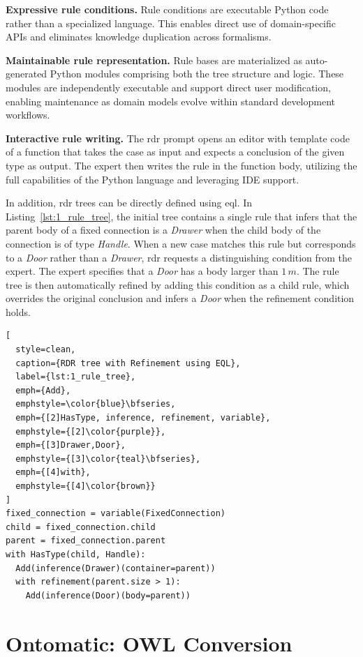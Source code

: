 \documentclass[a4paper,fleqn]{cas-sc}
\begin{document}
\textbf{Expressive rule conditions.} Rule conditions are executable Python code rather than a specialized language. This enables direct use of domain-specific APIs and eliminates knowledge duplication across formalisms.

\textbf{Maintainable rule representation.} Rule bases are materialized as auto-generated Python modules comprising both the tree structure and logic. These modules are independently executable and support direct user modification, enabling maintenance as domain models evolve within standard development workflows.

\textbf{Interactive rule writing.} The \ac{rdr} prompt opens an editor with template code of a function that takes the case as input and expects a conclusion of the given type as output. The expert then writes the rule in the function body, utilizing the full capabilities of the Python language and leveraging IDE support.

In addition, \ac{rdr} trees can be directly defined using \ac{eql}. In Listing~\ref{lst:1_rule_tree}, the initial tree contains a single rule that infers that the parent body of a fixed connection is a \textit{Drawer} when the child body of the connection is of type \textit{Handle}. When a new case matches this rule but corresponds to a \textit{Door} rather than a \textit{Drawer}, \ac{rdr} requests a distinguishing condition from the expert. The expert specifies that a \textit{Door} has a body larger than $1\,m$. The rule tree is then automatically refined by adding this condition as a child rule, which overrides the original conclusion and infers a \textit{Door} when the refinement condition holds.

\begin{lstlisting}[
  style=clean,
  caption={RDR tree with Refinement using EQL},
  label={lst:1_rule_tree},
  emph={Add},
  emphstyle=\color{blue}\bfseries,
  emph={[2]HasType, inference, refinement, variable},
  emphstyle={[2]\color{purple}},
  emph={[3]Drawer,Door},
  emphstyle={[3]\color{teal}\bfseries},
  emph={[4]with},
  emphstyle={[4]\color{brown}}
]
fixed_connection = variable(FixedConnection)
child = fixed_connection.child
parent = fixed_connection.parent
with HasType(child, Handle):
  Add(inference(Drawer)(container=parent))
  with refinement(parent.size > 1):
    Add(inference(Door)(body=parent))
\end{lstlisting}

\section{Ontomatic: OWL Conversion}
\label{sec:ontomatic}
\end{document}
